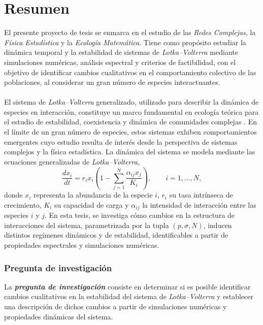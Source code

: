\chapter{Resumen}



\setlength{\parindent}{0cm} El presente proyecto de tesis se enmarca en el estudio de las \textit{Redes Complejas}, la \textit{Física Estadística} y la \textit{Ecología Matemática}. Tiene como propósito estudiar la dinámica temporal y la estabilidad de sistemas de \textit{Lotka--Volterra} mediante simulaciones numéricas, análisis espectral y criterios de factibilidad, con el objetivo de identificar cambios cualitativos en el comportamiento colectivo de las poblaciones, al considerar un gran número de especies interactuantes.
\\
\\
El sistema de \textit{Lotka--Volterra} generalizado, utilizado para describir la dinámica de especies en interacción, constituye un marco fundamental en ecología teórica para el estudio de estabilidad, coexistencia y dinámica de comunidades complejas \cite{may2007theoretical}. En el límite de un gran número de especies, estos sistemas exhiben comportamientos emergentes cuyo estudio resulta de interés desde la perspectiva de sistemas complejos y la física estadística. La dinámica del sistema se modela mediante las ecuaciones generalizadas de \textit{Lotka--Volterra},
$$\frac{dx_i}{dt}=r_ix_i\left(1-\sum_{j=1}^N \frac{\alpha_{ij}x_j}{K_i}\right),\qquad i=1,\dots,N,$$
donde $x_i$ representa la abundancia de la especie $i$, $r_i$ su tasa intrínseca de crecimiento, $K_i$ su capacidad de carga y $\alpha_{ij}$ la intensidad de interacción entre las especies $i$ y $j$. En esta tesis, se investiga cómo cambios en la estructura de interacciones del sistema, parametrizada por la tupla $(p,\sigma,N)$, inducen distintos regímenes dinámicos y de estabilidad, identificables a partir de propiedades espectrales y simulaciones numéricas.



\subsection*{Pregunta de investigación}

La \textbf{\textit{pregunta de investigación}} consiste en determinar si es posible identificar cambios cualitativos en la estabilidad del sistema de \textit{Lotka--Volterra} y establecer una descripción de dichos cambios a partir de simulaciones numéricas y propiedades dinámicas del sistema.
 


